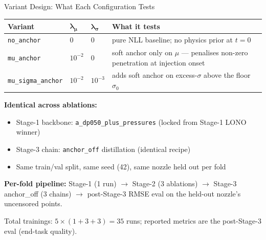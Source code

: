 \documentclass[UTF8,aspectratio=169]{ctexbeamer}
\newcommand{\good}[1]{\textcolor{green!45!black}{#1}}
\begin{document}
\begin{frame}{Variant Design: What Each Configuration Tests}
\small
\begin{center}
\renewcommand{\arraystretch}{1.25}
\begin{tabular}{@{}L{3.4cm} C{1.2cm} C{1.2cm} L{6.5cm}@{}}
\toprule
\textbf{Variant} & $\bm{\lambda_\mu}$ & $\bm{\lambda_\sigma}$ & \textbf{What it tests} \\
\midrule
\texttt{no\_anchor}        & 0       & 0       & pure NLL baseline; no physics prior at $t{=}0$ \\
\texttt{mu\_anchor}        & \good{$10^{-2}$} & 0       & \good{soft anchor only on $\mu$ — penalises non-zero penetration at injection onset} \\
\texttt{mu\_sigma\_anchor} & $10^{-2}$ & $10^{-3}$ & adds soft anchor on excess-$\sigma$ above the floor $\sigma_0$ \\
\bottomrule
\end{tabular}
\end{center}

\vspace{0.6em}
\textbf{Identical across ablations:}
\begin{itemize}\setlength\itemsep{2pt}
  \item Stage-1 backbone: \texttt{a\_dp050\_plus\_pressures} (locked from Stage-1 LONO winner)
  \item Stage-3 chain: \texttt{anchor\_off} distillation (identical recipe)
  \item Same train/val split, same seed (42), same nozzle held out per fold
\end{itemize}

\vspace{0.4em}
\textbf{Per-fold pipeline:} Stage-1 (1 run) $\to$ Stage-2 (3 ablations) $\to$ Stage-3 anchor\_off (3 chains) $\to$
post-Stage-3 RMSE eval on the held-out nozzle's uncensored points.

\vspace{0.3em}
\footnotesize
Total trainings: $5 \times (1{+}3{+}3) = 35$ runs; reported metrics are the post-Stage-3 eval (end-task quality).
\end{frame}
\end{document}
